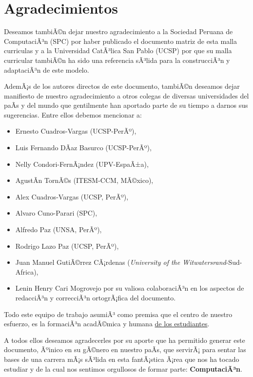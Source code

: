\chapter*{Agradecimientos}\label{chap:cs-ack}
%

Deseamos tambiÃ©n dejar nuestro agradecimiento a la Sociedad Peruana de ComputaciÃ³n (SPC) por 
haber publicado el documento matriz de esta malla curriculas y a la Universidad CatÃ³lica San Pablo (UCSP) 
por que su malla curricular tambiÃ©n ha sido una referencia sÃ³lida para la construcciÃ³n y adaptaciÃ³n de este modelo.

AdemÃ¡s de los autores directos de este documento, tambiÃ©n deseamos dejar manifiesto de nuestro 
agradecimiento a otros colegas de diversas universidades del paÃ­s y del mundo que gentilmente 
han aportado parte de su tiempo a darnos sus sugerencias. Entre ellos debemos mencionar a:

\begin{itemize}
\item Ernesto Cuadros-Vargas (UCSP-PerÃº), 
\item Luis Fernando DÃ­az Basurco (UCSP-PerÃº), 
\item Nelly Condori-FernÃ¡ndez (UPV-EspaÃ±a), 
\item AgustÃ­n TornÃ©s (ITESM-CCM, MÃ©xico), 
\item Alex Cuadros-Vargas (UCSP, PerÃº),
\item Alvaro Cuno-Parari (SPC),
\item Alfredo Paz (UNSA, PerÃº), 
\item Rodrigo Lazo Paz (UCSP, PerÃº),
\item Juan Manuel GutiÃ©rrez CÃ¡rdenas (\textit{University of the Witwatersrand}-Sud-Africa),
\item Lenin Henry Cari Mogrovejo por su valiosa colaboraciÃ³n en los aspectos de redacciÃ³n y correcciÃ³n ortogrÃ¡fica del documento.
\end{itemize}

Todo este equipo de trabajo asumiÃ³ como premisa que el centro de nuestro esfuerzo, 
es la formaciÃ³n acadÃ©mica y humana \underline{de los estudiantes}.

A todos ellos deseamos agradecerles por su aporte que ha permitido generar 
este documento, Ãºinico en su gÃ©nero en nuestro paÃ­s, que servirÃ¡ para sentar las 
bases de una carrera mÃ¡s sÃ³lida en esta fantÃ¡stica Ã¡rea que nos ha tocado estudiar y 
de la cual nos sentimos orgullosos de formar parte: \textbf{ComputaciÃ³n}.
